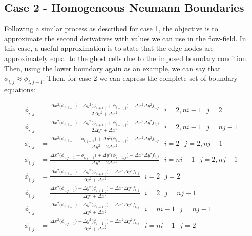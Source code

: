\documentclass{article}
\begin{document}
\subsection{Case 2 - Homogeneous Neumann Boundaries}

\vspace{1em}

\noindent Following a similar process as described for case 1, the objective is to approximate the second derivatives with values we can use in the flow-field. In this case, a useful approximation is to state that the edge nodes are approximately equal to the ghost cells due to the imposed boundary condition. Then, using the lower boundary again as an example, we can say that $\phi_{i,j} \approx \phi_{i,j-1}$. Then, for case 2 we can express the complete set of boundary equations:

\begin{align}
\phi_{i,j} &= \frac{ \Delta x^{2} \big( \phi_{i,j+1}  \big) + \Delta y^2 \big(  \phi_{i+1,j} + \phi_{i-1,j} \big) - \Delta x^{2} \Delta y^{2} f_{i,j} }{2 \Delta y^2  +  \Delta x^2} \ \ \ i=2,ni-1 \ \ \ j=2 \\
\phi_{i,j} &= \frac{ \Delta x^{2} \big( \phi_{i,j-1}  \big) + \Delta y^2 \big(  \phi_{i+1,j} + \phi_{i-1,j} \big) - \Delta x^{2} \Delta y^{2} f_{i,j} }{2 \Delta y^2  +  \Delta x^2} \ \ \ i=2,ni-1 \ \ \ j=nj-1 \\
\phi_{i,j} &= \frac{ \Delta x^{2} \big( \phi_{i,j+1} +  \phi_{i,j-1}   \big) + \Delta y^2 \big( \phi_{i+1,j} \big) - \Delta x^{2} \Delta y^{2} f_{i,j} }{ \Delta y^2  +  2 \Delta x^2} \ \ \ i=2 \ \ \ j=2,nj-1 \\
\phi_{i,j} &= \frac{ \Delta x^{2} \big( \phi_{i,j+1} +  \phi_{i,j-1}   \big) + \Delta y^2 \big( \phi_{i-1,j} \big) - \Delta x^{2} \Delta y^{2} f_{i,j} }{ \Delta y^2  +  2 \Delta x^2} \ \ \ i=ni-1 \ \ \ j=2,nj-1 \\
\phi_{i,j} &= \frac{ \Delta x^{2} \big( \phi_{i,j+1}  \big) + \Delta y^2 \big(  \phi_{i+1,j}  \big) - \Delta x^{2} \Delta y^{2} f_{i,j} }{ \Delta y^2  +  \Delta x^2} \ \ \ i=2 \ \ \ j=2 \\
\phi_{i,j} &= \frac{ \Delta x^{2} \big( \phi_{i,j-1}  \big) + \Delta y^2 \big(  \phi_{i+1,j}  \big) - \Delta x^{2} \Delta y^{2} f_{i,j} }{ \Delta y^2  +  \Delta x^2} \ \ \ i=2 \ \ \ j=nj-1 \\
\phi_{i,j} &= \frac{ \Delta x^{2} \big( \phi_{i,j-1}  \big) + \Delta y^2 \big(  \phi_{i-1,j}  \big) - \Delta x^{2} \Delta y^{2} f_{i,j} }{ \Delta y^2  +  \Delta x^2} \ \ \ i=ni-1 \ \ \ j=nj-1 \\
\phi_{i,j} &= \frac{ \Delta x^{2} \big( \phi_{i,j+1}  \big) + \Delta y^2 \big(  \phi_{i-1,j}  \big) - \Delta x^{2} \Delta y^{2} f_{i,j} }{ \Delta y^2  +  \Delta x^2} \ \ \ i=ni-1 \ \ \ j=2 
\end{align}
\end{document}
